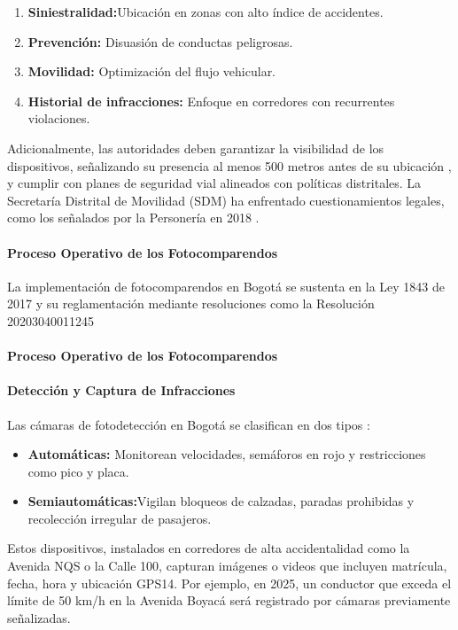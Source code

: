 \begin{enumerate}
    \item \textbf{Siniestralidad:}Ubicación en zonas con alto índice de accidentes. 
    \item \textbf{Prevención:} Disuasión de conductas peligrosas. 
    \item \textbf{Movilidad: } Optimización del flujo vehicular.
        \item \textbf{Historial de infracciones:} Enfoque en corredores con recurrentes violaciones.
\end{enumerate}

Adicionalmente, las autoridades deben garantizar la visibilidad de los dispositivos, señalizando su presencia al menos 500 metros antes de su ubicación \parencite{ley1843}, y cumplir con planes de seguridad vial alineados con políticas distritales. La Secretaría Distrital de Movilidad (SDM) ha enfrentado cuestionamientos legales, como los señalados por la Personería en 2018 \parencite{sdm2023camaras}.

\paragraph{Proceso Operativo de los Fotocomparendos} La implementación de fotocomparendos en Bogotá se sustenta en la Ley 1843 de 2017 \parencite{ley1843} y su reglamentación mediante resoluciones como la Resolución 20203040011245

\paragraph{Proceso Operativo de los Fotocomparendos }
\paragraph{Detección y Captura de Infracciones }
Las cámaras de fotodetección en Bogotá se clasifican en dos tipos \parencite{supertransporte2021, mintransporte2023}: 

\begin{itemize}
    \item \textbf{Automáticas: }Monitorean velocidades, semáforos en rojo y restricciones como pico y placa.
    \item \textbf{Semiautomáticas:}Vigilan bloqueos de calzadas, paradas prohibidas y recolección irregular de pasajeros.
\end{itemize}

Estos dispositivos, instalados en corredores de alta accidentalidad como la Avenida NQS o la Calle 100, capturan imágenes o videos que incluyen matrícula, fecha, hora y ubicación GPS14. Por ejemplo, en 2025, un conductor que exceda el límite de 50 km/h en la Avenida Boyacá será registrado por cámaras previamente señalizadas. 

